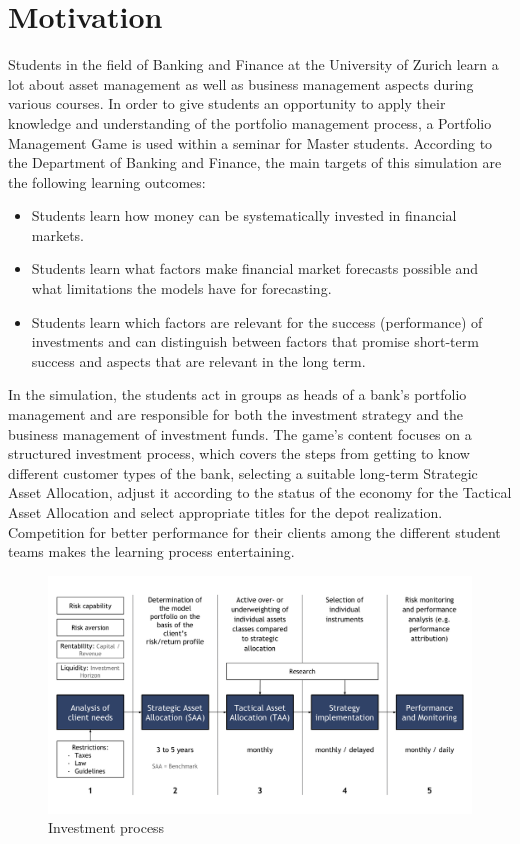 \section{Motivation}
\label{sec:motivation}

Students in the field of Banking and Finance at the University of Zurich learn a lot about asset management as well as business management aspects during various courses. In order to give students an opportunity to apply their knowledge and understanding of the portfolio management process, a Portfolio Management Game is used within a seminar for Master students. According to the Department of Banking and Finance, the main targets of this simulation are the following learning outcomes:
\begin{itemize}
  \item Students learn how money can be systematically invested in financial markets.
  \item Students learn what factors make financial market forecasts possible and what limitations the models have for forecasting.
  \item Students learn which factors are relevant for the success (performance) of investments and can distinguish between factors that promise short-term success and aspects that are relevant in the long term.
\end{itemize}

In the simulation, the students act in groups as heads of a bank’s portfolio management and are responsible for both the investment strategy and the business management of investment funds. The game's content focuses on a structured investment process, which covers the steps from getting to know different customer types of the bank, selecting a suitable long-term Strategic Asset Allocation, adjust it according to the status of the economy for the Tactical Asset Allocation and select appropriate titles for the depot realization. Competition for better performance for their clients among the different student teams makes the learning process entertaining.

\begin{figure}[h!]
  \centering
  \includegraphics[scale=0.6]{img/private_banking_process.png}    \caption{Investment process}
\end{figure}

